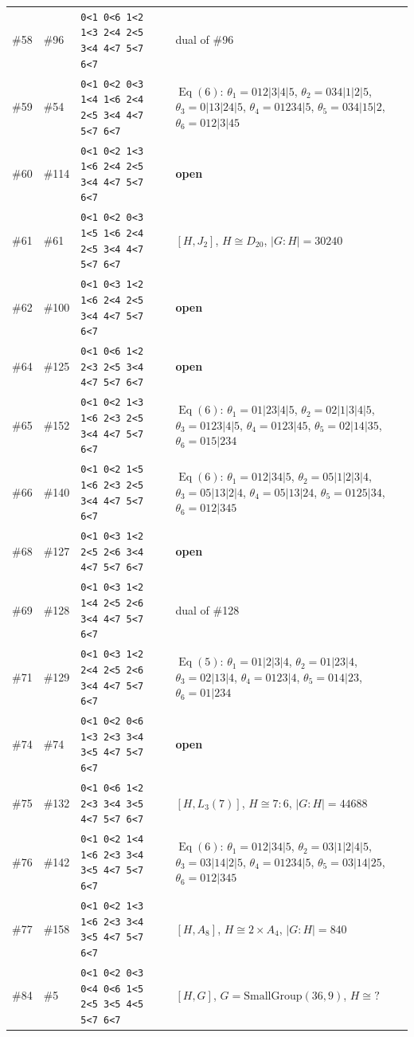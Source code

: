 \documentclass[11pt]{article}
\theoremstyle{remark}
\newcommand{\Eq}{\operatorname{Eq}}
\begin{document}
{\begin{longtable}{@{}l l p{4.9cm} p{7.4cm}@{}}
\#58 & \#96 & \texttt{0<1 0<6 1<2 1<3 2<4 2<5 3<4 4<7 5<7 6<7} & dual of \#96\\
\#59 & \#54 & \texttt{0<1 0<2 0<3 1<4 1<6 2<4 2<5 3<4 4<7 5<7 6<7} & $\Eq(6)$: $\theta_1=012|3|4|5$, $\theta_2=034|1|2|5$, $\theta_3=0|13|24|5$, $\theta_4=01234|5$, $\theta_5=034|15|2$, $\theta_6=012|3|45$\\
\#60 & \#114 & \texttt{0<1 0<2 1<3 1<6 2<4 2<5 3<4 4<7 5<7 6<7} & \textbf{open}\\
\#61 & \#61 & \texttt{0<1 0<2 0<3 1<5 1<6 2<4 2<5 3<4 4<7 5<7 6<7} & $[H,J_2]$, $H\cong D_{20}$, $|G:H|=30240$\\
\#62 & \#100 & \texttt{0<1 0<3 1<2 1<6 2<4 2<5 3<4 4<7 5<7 6<7} & \textbf{open}\\
\#64 & \#125 & \texttt{0<1 0<6 1<2 2<3 2<5 3<4 4<7 5<7 6<7} & \textbf{open}\\
\#65 & \#152 & \texttt{0<1 0<2 1<3 1<6 2<3 2<5 3<4 4<7 5<7 6<7} & $\Eq(6)$: $\theta_1=01|23|4|5$, $\theta_2=02|1|3|4|5$, $\theta_3=0123|4|5$, $\theta_4=0123|45$, $\theta_5=02|14|35$, $\theta_6=015|234$\\
\#66 & \#140 & \texttt{0<1 0<2 1<5 1<6 2<3 2<5 3<4 4<7 5<7 6<7} & $\Eq(6)$: $\theta_1=012|34|5$, $\theta_2=05|1|2|3|4$, $\theta_3=05|13|2|4$, $\theta_4=05|13|24$, $\theta_5=0125|34$, $\theta_6=012|345$\\
\#68 & \#127 & \texttt{0<1 0<3 1<2 2<5 2<6 3<4 4<7 5<7 6<7} & \textbf{open}\\
\#69 & \#128 & \texttt{0<1 0<3 1<2 1<4 2<5 2<6 3<4 4<7 5<7 6<7} & dual of \#128\\
\#71 & \#129 & \texttt{0<1 0<3 1<2 2<4 2<5 2<6 3<4 4<7 5<7 6<7} & $\Eq(5)$: $\theta_1=01|2|3|4$, $\theta_2=01|23|4$, $\theta_3=02|13|4$, $\theta_4=0123|4$, $\theta_5=014|23$, $\theta_6=01|234$\\
\#74 & \#74 & \texttt{0<1 0<2 0<6 1<3 2<3 3<4 3<5 4<7 5<7 6<7} & \textbf{open}\\
\#75 & \#132 & \texttt{0<1 0<6 1<2 2<3 3<4 3<5 4<7 5<7 6<7} & $[H,L_3(7)]$, $H\cong 7{:}6$, $|G:H|=44688$\\
\#76 & \#142 & \texttt{0<1 0<2 1<4 1<6 2<3 3<4 3<5 4<7 5<7 6<7} & $\Eq(6)$: $\theta_1=012|34|5$, $\theta_2=03|1|2|4|5$, $\theta_3=03|14|2|5$, $\theta_4=01234|5$, $\theta_5=03|14|25$, $\theta_6=012|345$\\
\#77 & \#158 & \texttt{0<1 0<2 1<3 1<6 2<3 3<4 3<5 4<7 5<7 6<7} & $[H,A_8]$, $H\cong 2\times A_{4}$, $|G:H|=840$\\
\#84 & \#5 & \texttt{0<1 0<2 0<3 0<4 0<6 1<5 2<5 3<5 4<5 5<7 6<7} & $[H,G]$, $G=\mathrm{SmallGroup}(36,9)$, $H\cong ?$\\

\end{longtable}}
\end{document}
